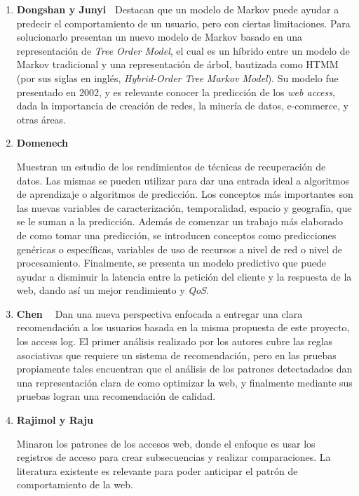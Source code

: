 \begin{enumerate}
  \item \textbf{Dongshan y Junyi~\cite{Dongshan2002} }
  {
	  Destacan que un modelo de Markov puede ayudar a predecir el comportamiento de un usuario, pero con ciertas limitaciones. Para solucionarlo presentan un nuevo modelo de Markov basado en una representación de \emph{Tree Order Model}, el cual es un híbrido entre un modelo de Markov tradicional y una representación de árbol, bautizada como HTMM (por sus siglas en inglés, \emph{Hybrid-Order Tree Markov Model}).
	  Su modelo fue presentado en 2002, y es relevante conocer la predicción de los \emph{web access}, dada la importancia de creación de redes, la minería de datos, e-commerce, y otras áreas.
	}
  \item \textbf{Domenech \etal~\cite{Domenech2006}}{  
  Muestran un estudio de los rendimientos de técnicas de recuperación de datos.
  Las mismas se pueden utilizar para dar una entrada ideal a algoritmos de aprendizaje o algoritmos de predicción. 
  Los conceptos más importantes son las nuevas variables de caracterización, temporalidad, espacio y geografía, que se le suman a la predicción. 
  Además de comenzar un trabajo más elaborado de como tomar una predicción, se introducen conceptos como predicciones genéricas o específicas, variables de uso de recursos a nivel de red o nivel de procesamiento.
  Finalmente, se presenta un modelo predictivo que puede ayudar a disminuir la latencia entre la petición del cliente y la respuesta de la web, dando así un mejor rendimiento y \emph{QoS}.
  
 }


  \item \textbf{Chen \etal~\cite{Chen2011}}{  
	Dan una nueva perspectiva enfocada a entregar una clara recomendación a los usuarios basada en la misma propuesta de este proyecto, los access log.
	El primer análisis realizado por los autores cubre las reglas asociativas que requiere un sistema de recomendación, pero en las pruebas propiamente tales encuentran que el análisis de los patrones detectadados dan una representación clara de como optimizar la web, y finalmente mediante sus pruebas logran una recomendación de calidad.}
  \item \textbf{Rajimol y Raju~\cite{Rajimol2012} }
	{  
	Minaron los patrones de los accesos web, donde el enfoque es usar los registros de acceso para crear subsecuencias y realizar comparaciones.
	La literatura existente es relevante para poder anticipar el patrón de comportamiento de la web.


}
\end{enumerate}
